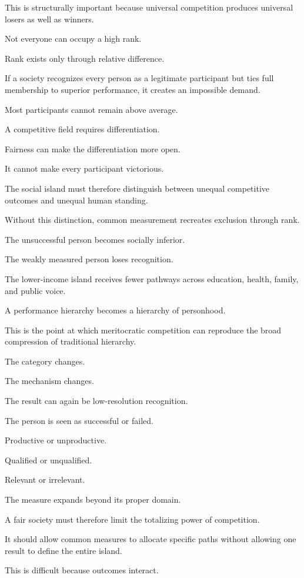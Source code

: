 This is structurally important because universal competition produces universal losers as well as winners.

Not everyone can occupy a high rank.

Rank exists only through relative difference.

If a society recognizes every person as a legitimate participant but ties full membership to superior performance, it creates an impossible demand.

Most participants cannot remain above average.

A competitive field requires differentiation.

Fairness can make the differentiation more open.

It cannot make every participant victorious.

The social island must therefore distinguish between unequal competitive outcomes and unequal human standing.

Without this distinction, common measurement recreates exclusion through rank.

The unsuccessful person becomes socially inferior.

The weakly measured person loses recognition.

The lower-income island receives fewer pathways across education, health, family, and public voice.

A performance hierarchy becomes a hierarchy of personhood.

This is the point at which meritocratic competition can reproduce the broad compression of traditional hierarchy.

The category changes.

The mechanism changes.

The result can again be low-resolution recognition.

The person is seen as successful or failed.

Productive or unproductive.

Qualified or unqualified.

Relevant or irrelevant.

The measure expands beyond its proper domain.

A fair society must therefore limit the totalizing power of competition.

It should allow common measures to allocate specific paths without allowing one result to define the entire island.

This is difficult because outcomes interact.

